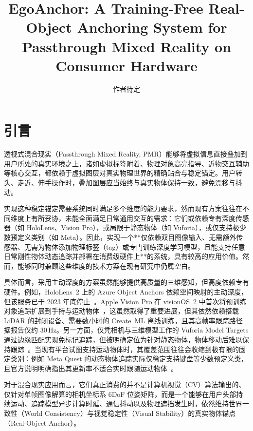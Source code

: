 \documentclass[review]{vgtc}
\title{EgoAnchor: A Training-Free Real-Object Anchoring System for Passthrough Mixed Reality on Consumer Hardware}
\author{作者待定}
\begin{document}
\maketitle

\section{引言}

透视式混合现实（Passthrough Mixed Reality, PMR）能够将虚拟信息直接叠加到用户所处的真实环境之上，诸如虚拟标签附着、物理对象高亮指导、近物交互辅助等核心交互，都依赖于虚拟图层对真实物理世界的精确贴合与稳定锚定。用户转头、走近、伸手操作时，叠加图层应当始终与真实物体保持一致，避免漂移与抖动。

实现这种稳定锚定需要系统同时满足多个维度的能力要求，然而现有方案往往在不同维度上有所妥协，未能全面满足日常通用交互的需求：它们或依赖专有深度传感器（如 HoloLens、Vision Pro），或局限于静态物体（如 Vuforia），或仅支持极少数预定义类别（如 Meta）。因此，实现一个**仅依赖双目图像输入、无需额外传感器、无需为物体添加物理标签（tag）或专门训练深度学习模型，且能支持任意日常刚性物体动态追踪并部署在消费级硬件上**的系统，具有较高的应用价值。然而，能够同时兼顾这些维度的技术方案在现有研究中仍属空白。

具体而言，采用主动深度的方案虽然能够提供高质量的三维感知，但高度依赖专有硬件。例如，HoloLens~2 上的 Azure Object Anchors 依赖空间映射的主动深度，但该服务已于 2023 年底停止~\cite{azureObjectAnchors}。Apple Vision Pro 在 visionOS~2 中首次将预训练对象追踪扩展到手持与运动物体~\cite{appleVisionOS27ObjectTracking}，这虽然取得了重要进展，但其依然依赖搭载 LiDAR 的封闭设备、需要数小时的 Create~ML 离线训练，且其高帧率跟踪路径据报告仅约 30\,Hz。另一方面，仅凭相机与三维模型工作的 Vuforia Model Targets 通过边缘匹配实现免标记追踪，但被明确定位为针对静态物体，物体移动后难以保持跟踪~\cite{vuforiaModelTargets}。当现有平台试图支持运动物体时，其覆盖范围往往会收缩到极有限的固定类别：例如 Meta Quest 的动态物体追踪实际仅稳定支持键盘等少数预定义类，且官方说明明确指出其更新率不适合实时跟随运动物体~\cite{metaDynamicObjectTracker,metaSceneOverview}。

对于混合现实应用而言，它们真正消费的并不是计算机视觉（CV）算法输出的、仅针对单帧图像解算的相机坐标系 6DoF 位姿矩阵，而是一个能够在用户头部持续运动、追踪模型异步计算时延、通信抖动以及物理遮挡发生时，依然维持世界一致性（World Consistency）与视觉稳定性（Visual Stability）的真实物体锚点（Real-Object Anchor）。
\end{document}
